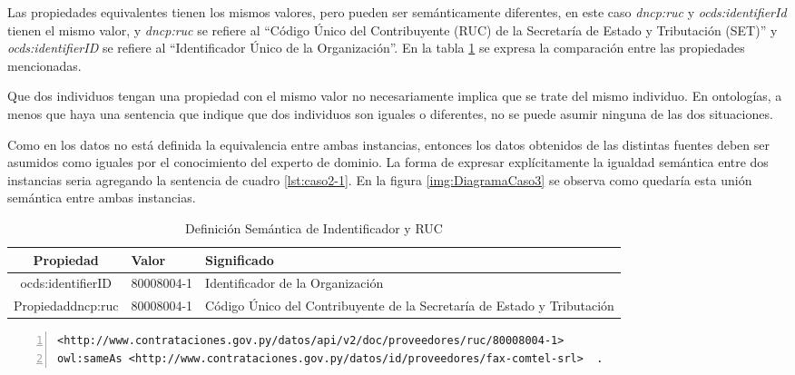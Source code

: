  Las propiedades equivalentes tienen los mismos valores, pero pueden ser semánticamente diferentes, en este caso \textit{dncp:ruc} y \textit{ocds:identifierId} tienen el mismo valor, y \textit{dncp:ruc} se refiere al “Código Único del Contribuyente (RUC) de la Secretaría de Estado y Tributación (SET)” y \textit{ocds:identifierID} se refiere al “Identificador Único de la Organización”. En la tabla \ref{table:semanticaID} se expresa la comparación entre las propiedades mencionadas.

 Que dos individuos tengan una propiedad con el mismo valor no necesariamente implica que se trate del mismo individuo. En ontologías, a menos que haya una sentencia que indique que dos individuos son iguales o diferentes, no se puede asumir ninguna de las dos situaciones. 

 Como en los datos no está definida la equivalencia entre ambas instancias, entonces los datos obtenidos de las distintas fuentes deben ser asumidos como iguales por el conocimiento del experto de dominio. La forma de expresar explícitamente la igualdad semántica entre dos instancias seria agregando la sentencia de cuadro \ref{lst:caso2-1}. En la figura \ref{img:DiagramaCaso3} se observa como quedaría esta unión semántica entre ambas instancias.
 


 \begin{table}[tbp]
    \centering
    \caption{Definición Semántica de Indentificador y RUC}
    \label{table:semanticaID}
    \resizebox{15cm}{!} {
    \begin{tabular}{|c|l|l|}
    \hline
    
Propiedad & Valor &  Significado \\ \hline

ocds:identifierID  & 80008004-1 &  Identificador de la Organización \\ \hline
Propiedaddncp:ruc & 80008004-1 &  Código Único del Contribuyente de la Secretaría de Estado y Tributación \\ \hline

    \end{tabular}
    }
    \end{table}



    \begin{lstlisting}[captionpos=b, caption=Declaracion de igualdad semantica de dos instancias, label=lst:caso2-1,  numbers=left,  numberstyle=\tiny\color{mygray},
        basicstyle=\tiny,frame=single]
<http://www.contrataciones.gov.py/datos/api/v2/doc/proveedores/ruc/80008004-1> 
owl:sameAs <http://www.contrataciones.gov.py/datos/id/proveedores/fax-comtel-srl>  .

     \end{lstlisting}

